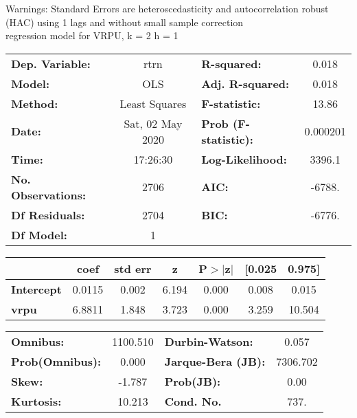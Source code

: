 Warnings: \newline
 [1] Standard Errors are heteroscedasticity and autocorrelation robust (HAC) using 1 lags and without small sample correction\\ 

regression model for VRPU, k = 2 h = 1\begin{center}
\begin{tabular}{lclc}
\toprule
\textbf{Dep. Variable:}    &       rtrn       & \textbf{  R-squared:         } &     0.018   \\
\textbf{Model:}            &       OLS        & \textbf{  Adj. R-squared:    } &     0.018   \\
\textbf{Method:}           &  Least Squares   & \textbf{  F-statistic:       } &     13.86   \\
\textbf{Date:}             & Sat, 02 May 2020 & \textbf{  Prob (F-statistic):} &  0.000201   \\
\textbf{Time:}             &     17:26:30     & \textbf{  Log-Likelihood:    } &    3396.1   \\
\textbf{No. Observations:} &        2706      & \textbf{  AIC:               } &    -6788.   \\
\textbf{Df Residuals:}     &        2704      & \textbf{  BIC:               } &    -6776.   \\
\textbf{Df Model:}         &           1      & \textbf{                     } &             \\
\bottomrule
\end{tabular}
\begin{tabular}{lcccccc}
                   & \textbf{coef} & \textbf{std err} & \textbf{z} & \textbf{P$> |$z$|$} & \textbf{[0.025} & \textbf{0.975]}  \\
\midrule
\textbf{Intercept} &       0.0115  &        0.002     &     6.194  &         0.000        &        0.008    &        0.015     \\
\textbf{vrpu}      &       6.8811  &        1.848     &     3.723  &         0.000        &        3.259    &       10.504     \\
\bottomrule
\end{tabular}
\begin{tabular}{lclc}
\textbf{Omnibus:}       & 1100.510 & \textbf{  Durbin-Watson:     } &    0.057  \\
\textbf{Prob(Omnibus):} &   0.000  & \textbf{  Jarque-Bera (JB):  } & 7306.702  \\
\textbf{Skew:}          &  -1.787  & \textbf{  Prob(JB):          } &     0.00  \\
\textbf{Kurtosis:}      &  10.213  & \textbf{  Cond. No.          } &     737.  \\
\bottomrule
\end{tabular}
\end{center}

